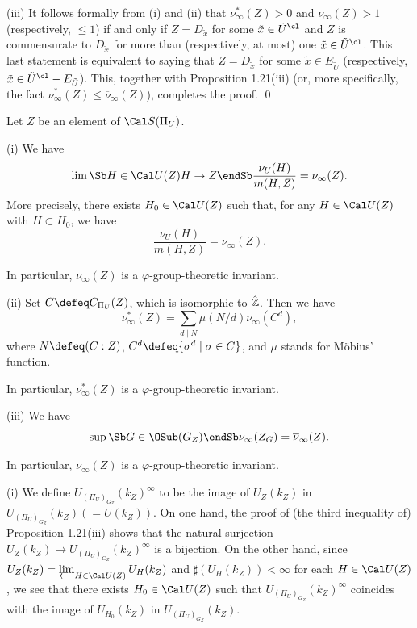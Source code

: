 \noindent
(iii) It follows formally from (i) and (ii) 
that $\nu^\ast_{\infty}(Z)>0$ and ${\overline\nu}_\infty(Z)>1$ 
(respectively, $\leq 1$)
if and only if $Z=D_{\tilde x}$ for some 
${\tilde x}\in{\tilde U}^{\cl}$ and 
$Z$ is commensurate to $D_{\tilde x}$ for more than (respectively, at most) 
one ${\tilde x}\in{\tilde U}^{\cl}$. This last statement 
is equivalent to saying that $Z=D_{\tilde x}$ for some 
${\tilde x}\in E_{\tilde U}$ (respectively, ${\tilde x}\in {\tilde U}^{\cl}- 
E_{\tilde U}$). 
This, together with Proposition 1.21(iii) 
(or, more specifically, 
the fact $\nu_{\infty}^\ast(Z)\leq{\overline\nu}_{\infty}(Z)$), 
completes the proof. 
\qed
\enddemo

Let $Z$ be an element of ${\Cal S}(\Pi_U)$. 

\noindent
{\rm (i)} We have 
$$\lim\Sb H\in{\Cal U}(Z) \\ H\to Z\endSb \frac{\nu_U(H)}{m(H,Z)}
=\nu_{\infty}(Z).$$
More precisely, there exists $H_0\in{\Cal U}(Z)$ such that, for any 
$H\in{\Cal U}(Z)$ with $H\subset H_0$, we have 
$$\frac{\nu_U(H)}{m(H,Z)}=\nu_{\infty}(Z).$$

In particular, $\nu_{\infty}(Z)$ is a $\varphi$-group-theoretic invariant. 

\noindent
{\rm (ii)} 
Set $C\defeq C_{\Pi_U}(Z)$, which is isomorphic to 
${\hat {\Bbb Z}}$. Then we have 
$$\nu_{\infty}^\ast(Z)=\sum_{d\mid N} \mu(N/d) \nu_{\infty}(C^d),$$
where $N\defeq (C:Z)$, 
$C^d\defeq\{\sigma^d\mid \sigma\in C\}$, 
and $\mu$ stands for M\"obius' function. 

In particular, $\nu_{\infty}^\ast(Z)$ is a 
$\varphi$-group-theoretic invariant. 

\noindent
{\rm (iii)} We have 
$$\sup\Sb G\in\OSub(G_Z)\endSb 
\nu_{\infty}(Z_{G})={\overline\nu}_{\infty}(Z).$$

In particular, ${\overline\nu}_{\infty}(Z)$ is a 
$\varphi$-group-theoretic invariant. 
\endproclaim

(i) We define $U_{(\Pi_U)_{G_Z}}(k_Z)^{\infty}$ 
to be the image of 
$U_Z(k_Z)$ in $U_{(\Pi_U)_{G_Z}}(k_Z) (= U(k_Z))$. 
On one hand, the proof of (the third inequality of) 
Proposition 1.21(iii) shows that 
the natural surjection $U_{Z}(k_Z)\to U_{(\Pi_U)_{G_Z}}(k_Z)^{\infty}$ 
is a bijection. On the other hand, 
since 
$U_Z(k_Z)=\varprojlim_{H\in{\Cal U}(Z)}U_H(k_Z)$ 
and $\sharp(U_H(k_Z))<\infty$ for each $H\in{\Cal U}(Z)$, we see that 
there exists $H_0\in{\Cal U}(Z)$ such that 
$U_{(\Pi_U)_{G_Z}}(k_Z)^{\infty}$ coincides with 
the image of $U_{H_0}(k_Z)$ in $U_{(\Pi_U)_{G_Z}}(k_Z)$. 

